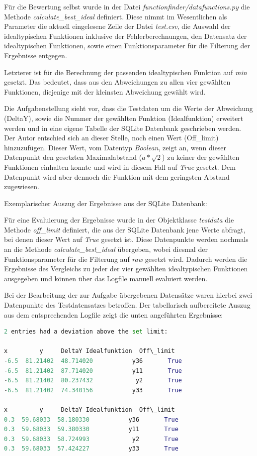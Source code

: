 Für die Bewertung selbst wurde in der Datei \emph{functionfinder/datafunctions.py} die Methode \emph{calculate\_best\_ideal} definiert. Diese nimmt im Wesentlichen als Parameter die aktuell eingelesene Zeile der Datei \emph{test.csv}, die Auswahl der idealtypischen Funktionen inklusive der Fehlerberechnungen, den Datensatz der idealtypischen Funktionen, sowie einen Funktionsparameter für die Filterung der Ergebnisse entgegen. 

Letzterer ist für die Berechnung der passenden idealtypischen Funktion auf \emph{min} gesetzt. Das bedeutet, dass aus den Abweichungen zu allen vier gewählten Funktionen, diejenige mit der kleinsten Abweichung gewählt wird.

Die Aufgabenstellung sieht vor, dass die Testdaten um die Werte der Abweichung (DeltaY), sowie die Nummer der gewählten Funktion (Idealfunktion) erweitert werden und in eine eigene Tabelle der SQLite Datenbank geschrieben werden. Der Autor entschied sich an dieser Stelle, noch einen Wert (Off\_limit) hinzuzufügen. Dieser Wert, vom Datentyp \emph{Boolean}, zeigt an, wenn dieser Datenpunkt den gesetzten Maximalabstand ($a*\sqrt{2}$) zu keiner der gewählten Funktionen einhalten konnte und wird in diesem Fall auf \emph{True} gesetzt. Dem Datenpunkt wird aber dennoch die Funktion mit dem geringsten Abstand zugewiesen.

Exemplarischer Auszug der Ergebnisse aus der SQLite Datenbank:



Für eine Evaluierung der Ergebnisse wurde in der Objektklasse \emph{testdata} die Methode \emph{off\_limit} definiert, die aus der SQLite Datenbank jene Werte abfragt, bei denen dieser Wert auf \emph{True} gesetzt ist. Diese Datenpunkte werden nochmals an die Methode \emph{calculate\_best\_ideal} übergeben, wobei diesmal der Funktionsparameter für die Filterung auf \emph{raw} gesetzt wird. Dadurch werden die Ergebnisse des Vergleichs zu jeder der vier gewählten idealtypischen Funktionen ausgegeben und können über das Logfile manuell evaluiert werden.

Bei der Bearbeitung der zur Aufgabe übergebenen Datensätze waren hierbei zwei Datenpunkte des Testdatensatzes betroffen. Der tabellarisch aufbereitete Auszug aus dem entsprechenden Logfile zeigt die unten angeführten Ergebnisse:

\begin{lstlisting}[language=python]
2 entries had a deviation above the set limit:

x         y     DeltaY Idealfunktion  Off\_limit
-6.5  81.21402  48.714020           y36       True
-6.5  81.21402  87.714020           y11       True
-6.5  81.21402  80.237432            y2       True
-6.5  81.21402  74.340156           y33       True

x         y     DeltaY Idealfunktion  Off\_limit
0.3  59.68033  58.180330           y36       True
0.3  59.68033  59.380330           y11       True
0.3  59.68033  58.724993            y2       True
0.3  59.68033  57.424227           y33       True
\end{lstlisting}

